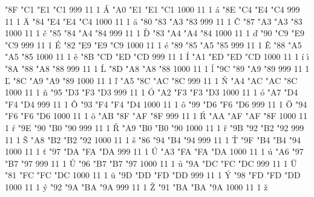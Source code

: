 
  

\setcharcode  "8F  "C1  "E1  "C1   999  11  1  \texaccent \'A
\setcharcode  "A0  "E1  "E1  "C1  1000  11  1  \texaccent \'a
\setcharcode  "8E  "C4  "E4  "C4   999  11  1  \texaccent \"A
\setcharcode  "84  "E4  "E4  "C4  1000  11  1  \texaccent \"a
\setcharcode  "80  "83  "A3  "83   999  11  1  \texaccent \v C
\setcharcode  "87  "A3  "A3  "83  1000  11  1  \texaccent \v c
\setcharcode  "85  "84  "A4  "84   999  11  1  \texaccent \v D
\setcharcode  "83  "A4  "A4  "84  1000  11  1  \texaccent \v d
\setcharcode  "90  "C9  "E9  "C9   999  11  1  \texaccent \'E
\setcharcode  "82  "E9  "E9  "C9  1000  11  1  \texaccent \'e
\setcharcode  "89  "85  "A5  "85   999  11  1  \texaccent \v E
\setcharcode  "88  "A5  "A5  "85  1000  11  1  \texaccent \v e
\setcharcode  "8B  "CD  "ED  "CD   999  11  1  \texaccent \'I
\setcharcode  "A1  "ED  "ED  "CD  1000  11  1  \texaccent \'i  \texaccent \'\i
\setcharcode  "8A  "88  "A8  "88   999  11  1  \texaccent \'L
\setcharcode  "8D  "A8  "A8  "88  1000  11  1  \texaccent \'l
\setcharcode  "9C  "89  "A9  "89   999  11  1  \texaccent \v L
\setcharcode  "8C  "A9  "A9  "89  1000  11  1  \texaccent \v l
\setcharcode  "A5  "8C  "AC  "8C   999  11  1  \texaccent \v N
\setcharcode  "A4  "AC  "AC  "8C  1000  11  1  \texaccent \v n
\setcharcode  "95  "D3  "F3  "D3   999  11  1  \texaccent \'O
\setcharcode  "A2  "F3  "F3  "D3  1000  11  1  \texaccent \'o
\setcharcode  "A7  "D4  "F4  "D4   999  11  1  \texaccent \^O
\setcharcode  "93  "F4  "F4  "D4  1000  11  1  \texaccent \^o
\setcharcode  "99  "D6  "F6  "D6   999  11  1  \texaccent \"O
\setcharcode  "94  "F6  "F6  "D6  1000  11  1  \texaccent \"o
\setcharcode  "AB  "8F  "AF  "8F   999  11  1  \texaccent \'R
\setcharcode  "AA  "AF  "AF  "8F  1000  11  1  \texaccent \'r
\setcharcode  "9E  "90  "B0  "90   999  11  1  \texaccent \v R
\setcharcode  "A9  "B0  "B0  "90  1000  11  1  \texaccent \v r
\setcharcode  "9B  "92  "B2  "92   999  11  1  \texaccent \v S
\setcharcode  "A8  "B2  "B2  "92  1000  11  1  \texaccent \v s
\setcharcode  "86  "94  "B4  "94   999  11  1  \texaccent \v T
\setcharcode  "9F  "B4  "B4  "94  1000  11  1  \texaccent \v t
\setcharcode  "97  "DA  "FA  "DA   999  11  1  \texaccent \'U
\setcharcode  "A3  "FA  "FA  "DA  1000  11  1  \texaccent \'u
\setcharcode  "A6  "97  "B7  "97   999  11  1  \texaccent \r U
\setcharcode  "96  "B7  "B7  "97  1000  11  1  \texaccent \r u
\setcharcode  "9A  "DC  "FC  "DC   999  11  1  \texaccent \"U
\setcharcode  "81  "FC  "FC  "DC  1000  11  1  \texaccent \"u
\setcharcode  "9D  "DD  "FD  "DD   999  11  1  \texaccent \'Y
\setcharcode  "98  "FD  "FD  "DD  1000  11  1  \texaccent \'y
\setcharcode  "92  "9A  "BA  "9A   999  11  1  \texaccent \v Z
\setcharcode  "91  "BA  "BA  "9A  1000  11  1  \texaccent \v z

